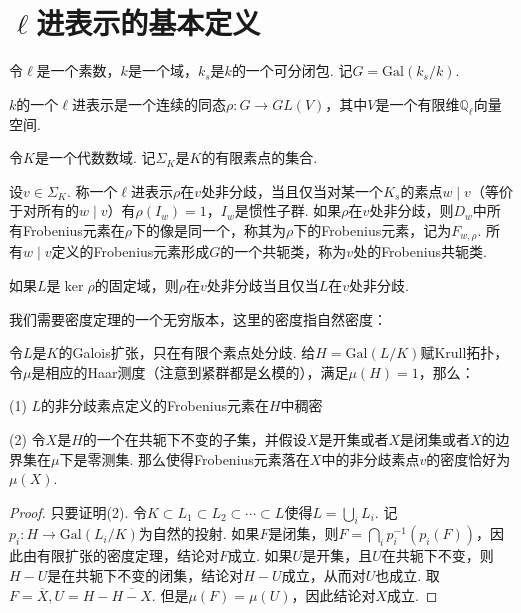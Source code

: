 \section{\texorpdfstring{$\ell$}{ELL}进表示的基本定义}

令$\ell$是一个素数，$k$是一个域，$k_s$是$k$的一个可分闭包. 记$G = \mathrm{Gal}(k_{s}/k)$.

\begin{cdef}
    $k$的一个$\ell$进表示是一个连续的同态$\rho: G\to GL(V)$，其中$V$是一个有限维$\mathbb{Q}_{\ell}$向量空间.
\end{cdef}

令$K$是一个代数数域. 记$\Sigma_K$是$K$的有限素点的集合.

\begin{cdef}
    设$v\in \Sigma_K$. 称一个$\ell$进表示$\rho$在$v$处非分歧，当且仅当对某一个$K_{s}$的素点$w\mid v$（等价于对所有的$w\mid v$）有$\rho(I_w) = 1$，$I_w$是惯性子群. 如果$\rho$在$v$处非分歧，则$D_w$中所有Frobenius元素在$\rho$下的像是同一个，称其为$\rho$下的Frobenius元素，记为$F_{w, \rho}$. 所有$w\mid v$定义的Frobenius元素形成$G$的一个共轭类，称为$v$处的Frobenius共轭类.
\end{cdef}

\begin{crem}
    如果$L$是$\ker \rho$的固定域，则$\rho$在$v$处非分歧当且仅当$L$在$v$处非分歧.
\end{crem}

我们需要\Chebotarev 密度定理的一个无穷版本，这里的密度指自然密度：

\begin{cthm}
    令$L$是$K$的Galois扩张，只在有限个素点处分歧. 给$H = \mathrm{Gal}(L/K)$赋Krull拓扑，令$\mu$是相应的Haar测度（注意到紧群都是幺模的），满足$\mu(H) = 1$，那么：

    (1) $L$的非分歧素点定义的Frobenius元素在$H$中稠密

    (2) 令$X$是$H$的一个在共轭下不变的子集，并假设$X$是开集或者$X$是闭集或者$X$的边界集在$\mu$下是零测集. 那么使得Frobenius元素落在$X$中的非分歧素点$v$的密度恰好为$\mu(X)$.
\end{cthm}

\begin{proof}
    只要证明(2). 令$K\subset L_1\subset L_2\subset \cdots \subset L$使得$L = \bigcup_i L_i$. 记$p_i: H\to \mathrm{Gal}(L_i/K)$为自然的投射. 如果$F$是闭集，则$F = \bigcap_i p_i^{-1}(p_i(F))$，因此由有限扩张的\Chebotarev 密度定理，结论对$F$成立. 如果$U$是开集，且$U$在共轭下不变，则$H-U$是在共轭下不变的闭集，结论对$H-U$成立，从而对$U$也成立. 取$F = \overline{X}, U = H - \overline{H-X}$. 但是$\mu(F) = \mu(U)$，因此结论对$X$成立.
\end{proof}

